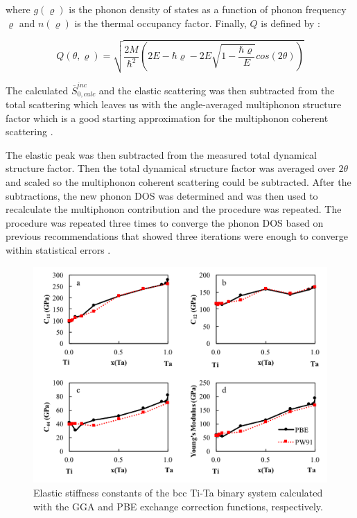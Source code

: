 \noindent where $g(\varrho)$ is the phonon density of states as a function of phonon frequency $\varrho$ and $n(\varrho)$ is the thermal occupancy factor. Finally, $Q$ is defined by \cite{Manley2001}:

\begin{equation}
\label{eq: Q}
Q(\theta, \varrho) = \sqrt{\frac{2M}{\hbar^{2}} \left( 2E - \hbar \varrho - 2E \sqrt{1-\frac{\hbar \varrho}{E}}cos(2\theta) \right)}
\end{equation}

\noindent The calculated $\overline{S}_{0,calc}^{inc}$ and the elastic scattering was then subtracted from the total scattering which leaves us with the angle-averaged multiphonon structure factor which is a good starting approximation for the multiphonon coherent scattering \cite{Manley2001}. 

The elastic peak was then subtracted from the measured total dynamical structure factor.  Then the total dynamical structure factor was averaged over $2\theta$ and scaled so the multiphonon coherent scattering could be subtracted. After the subtractions, the new phonon DOS was determined and was then used to recalculate the multiphonon contribution and the procedure was repeated. The procedure was repeated three times to converge the phonon DOS based on previous recommendations that showed three iterations were enough to converge within statistical errors \cite{Manley2001}.

\pagebreak
\begin{figure}[H]
	\centering
	\includegraphics[width=\textwidth]{Chapter-2/Figures/PBEvsPW91.png}
	\caption{Elastic stiffness constants of the bcc Ti-Ta binary system calculated with the GGA and PBE exchange correction functions, respectively.}
	\label{Ch2-figure:PBEvsPW91}
\end{figure}
